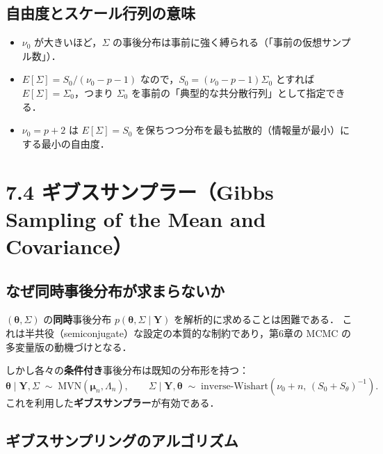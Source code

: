 \documentclass[lualatex,ja=standard,a4paper,12pt]{bxjsarticle}
\newcommand{\mvn}{\mathrm{MVN}}
\newcommand{\IW}{\mathrm{inverse\text{-}Wishart}}
\begin{document}
\subsection{自由度とスケール行列の意味}

\begin{itemize}
  \item $\nu_0$ が大きいほど，$\Sigma$ の事後分布は事前に強く縛られる（「事前の仮想サンプル数」）．
  \item $E[\Sigma] = S_0/(\nu_0 - p - 1)$ なので，$S_0 = (\nu_0-p-1)\Sigma_0$ とすれば $E[\Sigma] = \Sigma_0$，つまり $\Sigma_0$ を事前の「典型的な共分散行列」として指定できる．
  \item $\nu_0 = p + 2$ は $E[\Sigma] = S_0$ を保ちつつ分布を最も拡散的（情報量が最小）にする最小の自由度．
\end{itemize}

\section{7.4 ギブスサンプラー（Gibbs Sampling of the Mean and Covariance）}

\subsection{なぜ同時事後分布が求まらないか}

$(\bm{\theta}, \Sigma)$ の\textbf{同時}事後分布 $p(\bm{\theta}, \Sigma \mid \bm{Y})$ を解析的に求めることは困難である．
これは半共役（semiconjugate）な設定の本質的な制約であり，第6章の MCMC の多変量版の動機づけとなる．

しかし各々の\textbf{条件付き}事後分布は既知の分布形を持つ：
\[
  \bm{\theta} \mid \bm{Y}, \Sigma \;\sim\; \mvn(\bm{\mu}_n, \Lambda_n),
  \qquad
  \Sigma \mid \bm{Y}, \bm{\theta} \;\sim\; \IW(\nu_0+n,\, (S_0+S_\theta)^{-1}).
\]
これを利用した\textbf{ギブスサンプラー}が有効である．

\subsection{ギブスサンプリングのアルゴリズム}
\end{document}
